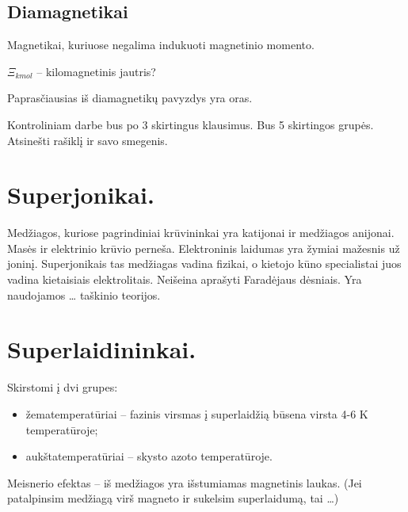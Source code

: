 \subsection{Diamagnetikai}

Magnetikai, kuriuose negalima indukuoti magnetinio momento.

$\Xi_{kmol}$ – kilomagnetinis jautris?

Paprasčiausias iš diamagnetikų pavyzdys yra oras.

Kontroliniam darbe bus po 3 skirtingus klausimus. Bus 5 skirtingos
grupės. Atsinešti rašiklį ir savo smegenis.

\section{Superjonikai.}
Medžiagos, kuriose pagrindiniai krūvininkai yra katijonai ir medžiagos
anijonai. Masės ir elektrinio krūvio perneša. Elektroninis laidumas yra
žymiai mažesnis už joninį. Superjonikais tas medžiagas vadina fizikai,
o kietojo kūno specialistai juos vadina kietaisiais elektrolitais.
Neišeina aprašyti Faradėjaus dėsniais. Yra naudojamos … taškinio teorijos.
\section{Superlaidininkai.}
Skirstomi į dvi grupes:
\begin{itemize}
  \item žematemperatūriai – fazinis virsmas į superlaidžią būsena virsta
    4-6 K temperatūroje;
  \item aukštatemperatūriai – skysto azoto temperatūroje.
\end{itemize}
Meisnerio efektas – iš medžiagos yra išstumiamas magnetinis laukas.
(Jei patalpinsim medžiagą virš magneto ir sukelsim superlaidumą,
tai …)

